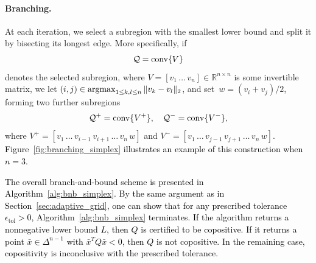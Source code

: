 \documentclass[12pt]{article}
\newcommand{\reals}{\mathbb{R}}
\newcommand{\conv}{\operatornamewithlimits{conv}}
\newcommand{\mcQ}{\mathcal{Q}}
\theoremstyle{remark}
\begin{document}
\paragraph{Branching.}
At each iteration, we select a subregion with the smallest lower bound and split it by bisecting its longest edge. More specifically, if 
\begin{equation*}
\mcQ=\conv\{V\}
\end{equation*}
denotes the selected subregion, where $V = [v_1 \,\ldots\, v_n] \in\reals^{n\times n}$ is some invertible matrix, we let $(i,j)\in \operatornamewithlimits{argmax}_{1 \le k, l \le n} \|v_k-v_l\|_2$, and set~$w= (v_{i}+v_{j})/2$, forming two further subregions
\[
    \mcQ^+=\conv\{V^+\},\quad \mcQ^-=\conv\{V^-\},\]
where $V^+=[v_{1}\, \ldots\, v_{i-1}\, v_{i+1}\, \ldots\, v_{n}\, w]$ and $V^-=[v_{1}\, \ldots\, v_{j-1}\, v_{j+1}\, \ldots\, v_{n}\, w]$.
\textcolor{black}{Figure~\ref{fig:branching_simplex} illustrates an example of this construction when $n=3$.}



\textcolor{black}{
The 
overall branch-and-bound scheme is presented in Algorithm~\ref{alg:bnb_simplex}. 
By the same argument as in Section~\ref{sec:adaptive_grid}, one can show that for any prescribed tolerance $\epsilon_{\text{tol}}>0$, 
Algorithm~\ref{alg:bnb_simplex} terminates. If the algorithm returns a nonnegative lower bound $L$, then $Q$ is certified to be copositive. If it returns a point $\bar{x}\in\Delta^{n-1}$ with $\bar{x}^TQ\bar{x}<0$, then $Q$ is not copositive. In the remaining case, copositivity is inconclusive with the prescribed tolerance.}
 
\end{document}
